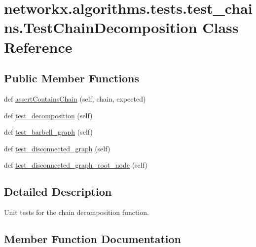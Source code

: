 \hypertarget{classnetworkx_1_1algorithms_1_1tests_1_1test__chains_1_1TestChainDecomposition}{}\section{networkx.\+algorithms.\+tests.\+test\+\_\+chains.\+Test\+Chain\+Decomposition Class Reference}
\label{classnetworkx_1_1algorithms_1_1tests_1_1test__chains_1_1TestChainDecomposition}
\subsection*{Public Member Functions}
\begin{DoxyCompactItemize}
\item 
def \hyperlink{classnetworkx_1_1algorithms_1_1tests_1_1test__chains_1_1TestChainDecomposition_adfcf4e3463c19fcc18545ce6fb5fe026}{assert\+Contains\+Chain} (self, chain, expected)
\item 
def \hyperlink{classnetworkx_1_1algorithms_1_1tests_1_1test__chains_1_1TestChainDecomposition_a13cfc6ab55c6973e26d0bd6fe8d39a48}{test\+\_\+decomposition} (self)
\item 
def \hyperlink{classnetworkx_1_1algorithms_1_1tests_1_1test__chains_1_1TestChainDecomposition_a6956e381831a6b4e86b07b3424774334}{test\+\_\+barbell\+\_\+graph} (self)
\item 
def \hyperlink{classnetworkx_1_1algorithms_1_1tests_1_1test__chains_1_1TestChainDecomposition_adf44db063101a62da75746cd9a8d72e1}{test\+\_\+disconnected\+\_\+graph} (self)
\item 
def \hyperlink{classnetworkx_1_1algorithms_1_1tests_1_1test__chains_1_1TestChainDecomposition_a255e917f20acf400ab5935950dbd9e9d}{test\+\_\+disconnected\+\_\+graph\+\_\+root\+\_\+node} (self)
\end{DoxyCompactItemize}


\subsection{Detailed Description}
\begin{DoxyVerb}Unit tests for the chain decomposition function.\end{DoxyVerb}
 

\subsection{Member Function Documentation}
\mbox{\label{classnetworkx_1_1algorithms_1_1tests_1_1test__chains_1_1TestChainDecomposition_adfcf4e3463c19fcc18545ce6fb5fe026}} 

